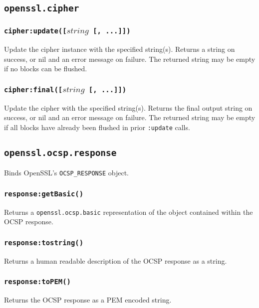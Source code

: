 \documentclass[11pt, oneside]{memoir}
\newcommand*{\fn}[1]{\texttt{#1}\xspace}
\newcommand*{\module}[1]{\texttt{#1}\xspace}
\newcounter{toccols}
\newenvironment{Module}[1]{
	\subsection{\texttt{#1}}
	\addtocontents{toc}{
		\protect\begin{multicols}{\value{toccols}}
	}
}{
	\addtocontents{toc}{\protect\end{multicols}}
}
\begin{document}
\begin{Module}{openssl.cipher}
\subsubsection[\fn{cipher:update}]{\fn{cipher:update([$string$ [, ...]])}}

Update the cipher instance with the specified string(s). Returns a string on success, or nil and an error message on failure. The returned string may be empty if no blocks can be flushed.

\subsubsection[\fn{cipher:final}]{\fn{cipher:final([$string$ [, ...]])}}

Update the cipher with the specified string(s). Returns the final output string on success, or nil and an error message on failure. The returned string may be empty if all blocks have already been flushed in prior \fn{:update} calls.

\end{Module}


\begin{Module}{openssl.ocsp.response}

Binds OpenSSL's \texttt{OCSP\_RESPONSE} object.

\subsubsection[\fn{response:getBasic}]{\fn{response:getBasic()}}

Returns a \module{openssl.ocsp.basic} representation of the object contained within the OCSP response.

\subsubsection[\fn{response:tostring}]{\fn{response:tostring()}}

Returns a human readable description of the OCSP response as a string.

\subsubsection[\fn{response:toPEM}]{\fn{response:toPEM()}}

Returns the OCSP response as a PEM encoded string.

\end{Module}
\end{document}
